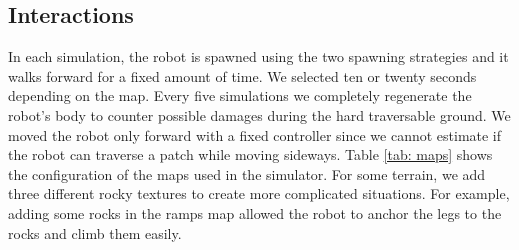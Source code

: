\documentclass[../document.tex]{subfiles}
\begin{document}
\subsection{Interactions}
In each simulation, the robot is spawned using the two spawning strategies and it walks forward for a fixed amount of time. We selected ten or twenty seconds depending on the map. Every five simulations we completely regenerate the robot's body to counter possible damages during the hard traversable ground. We moved the robot only forward with a fixed controller since we cannot estimate if the robot can traverse a patch while moving sideways. Table \ref{tab: maps} shows the configuration of the maps used in the simulator. For some terrain, we add three different rocky textures to create more complicated situations. For example, adding some rocks in the ramps map allowed the robot to anchor the legs to the rocks and climb them easily.
\end{document}
